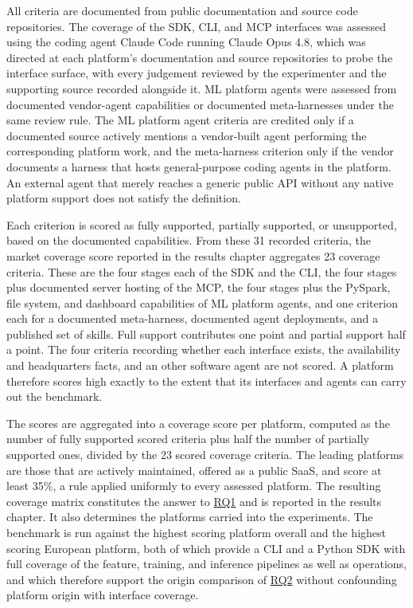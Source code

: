 \documentclass[
english,                 %
bibtex,                  %
]{kththesis}
\numberwithin{listing}{chapter}
\begin{document}
All criteria are documented from public documentation and source code repositories. The coverage of the \gls{SDK}, \gls{CLI}, and \gls{MCP} interfaces was assessed using the coding agent Claude Code running Claude Opus 4.8, which was directed at each platform's documentation and source repositories to probe the interface surface, with every judgement reviewed by the experimenter and the supporting source recorded alongside it. \Gls{ML} platform agents were assessed from documented vendor-agent capabilities or documented meta-harnesses under the same review rule. The \gls{ML} platform agent criteria are credited only if a documented source actively mentions a vendor-built agent performing the corresponding platform work, and the meta-harness criterion only if the vendor documents a harness that hosts general-purpose coding agents in the platform. An external agent that merely reaches a generic public \gls{API} without any native platform support does not satisfy the definition.

Each criterion is scored as fully supported, partially supported, or unsupported, based on the documented capabilities. From these 31 recorded criteria, the market coverage score reported in the results chapter aggregates 23 coverage criteria. These are the four stages each of the \gls{SDK} and the \gls{CLI}, the four stages plus documented server hosting of the \gls{MCP}, the four stages plus the PySpark, file system, and dashboard capabilities of \gls{ML} platform agents, and one criterion each for a documented meta-harness, documented agent deployments, and a published set of skills. Full support contributes one point and partial support half a point. The four criteria recording whether each interface exists, the availability and headquarters facts, and an other software agent are not scored. A platform therefore scores high exactly to the extent that its interfaces and agents can carry out the benchmark.

The scores are aggregated into a coverage score per platform, computed as the number of fully supported scored criteria plus half the number of partially supported ones, divided by the 23 scored coverage criteria. The leading platforms are those that are actively maintained, offered as a public \gls{SaaS}, and score at least 35\%, a rule applied uniformly to every assessed platform. The resulting coverage matrix constitutes the answer to \hyperref[rq1]{RQ1} and is reported in the results chapter. It also determines the platforms carried into the experiments. The benchmark is run against the highest scoring platform overall and the highest scoring European platform, both of which provide a \gls{CLI} and a Python \gls{SDK} with full coverage of the feature, training, and inference pipelines as well as operations, and which therefore support the origin comparison of \hyperref[rq2]{RQ2} without confounding platform origin with interface coverage.
\end{document}
